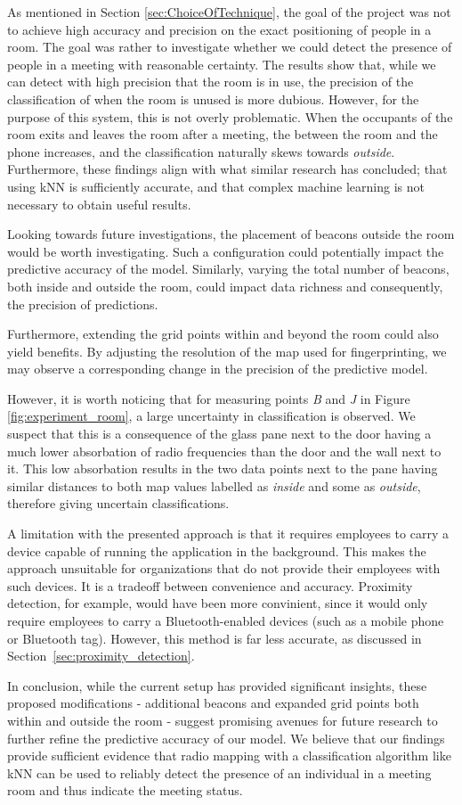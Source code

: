 As mentioned in Section \ref{sec:ChoiceOfTechnique}, the goal of the project was not to achieve high accuracy and precision on the exact positioning of people in a room. 
The goal was rather to investigate whether we could detect the presence of people in a meeting with reasonable certainty.
The results show that, while we can detect with high precision that the room is in use, the precision of the classification of when the room is unused is more dubious. 
However, for the purpose of this system, this is not overly problematic. 
When the occupants of the room exits and leaves the room after a meeting, the between the room and the phone increases, and the classification naturally skews towards \textit{outside}.
Furthermore, these findings align with what similar research has concluded; that using kNN is sufficiently accurate, and that complex machine learning is not necessary to obtain useful results.\cite{ble_kneares_neural}

Looking towards future investigations, the placement of beacons outside the room would be worth investigating.
Such a configuration could potentially impact the predictive accuracy of the model.
Similarly, varying the total number of beacons, both inside and outside the room, could impact data richness and consequently, the precision of predictions.

Furthermore, extending the grid points within and beyond the room could also yield benefits. By adjusting the resolution of the map used for fingerprinting, we may observe a corresponding change in the precision of the predictive model. 

However, it is worth noticing that for measuring points \textit{B} and \textit{J} in Figure \ref{fig:experiment_room}, a large uncertainty in classification is observed.
We suspect that this is a consequence of the glass pane next to the door having a much lower absorbation of radio frequencies than the door and the wall next to it.
This low absorbation results in the two data points next to the pane having similar distances to both map values labelled as \textit{inside} and some as \textit{outside}, therefore giving uncertain classifications.

A limitation with the presented approach is that it requires employees to carry a device capable of running the application in the background.
This makes the approach unsuitable for organizations that do not provide their employees with such devices.
It is a tradeoff between convenience and accuracy.
Proximity detection, for example, would have been more convinient, since it would only require employees to carry a Bluetooth-enabled devices (such as a mobile phone or Bluetooth tag). However, this method is far less accurate, as discussed in Section~\ref{sec:proximity_detection}.


In conclusion, while the current setup has provided significant insights, these proposed modifications - additional beacons and expanded grid points both within and outside the room - suggest promising avenues for future research to further refine the predictive accuracy of our model.
We believe that our findings provide sufficient evidence that radio mapping with a classification algorithm like kNN can be used to reliably detect the presence of an individual in a meeting room and thus indicate the meeting status.